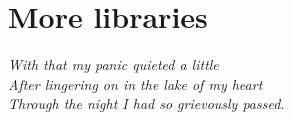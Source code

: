 \documentclass[a4paper]{report}
\begin{document}
\newpage

\addtolength{\hoffset}{-1cm}



%

%

%

\newpage
\chapter{More libraries}
\begin{flushright}
\textit{
					With that my panic quieted a little \\
          After lingering on in the lake of my heart \\
          Through the night I had so grievously passed. \\ 
       }
\end{flushright}
\addtolength{\hoffset}{1cm}

\newpage

\addtolength{\hoffset}{-1cm}

\end{document}
